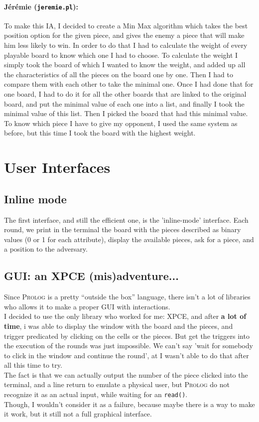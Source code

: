 \documentclass[a4paper,11pt]{article}
\newcommand{\tw}[1]{\texttt{#1}}
\begin{document}
		\paragraph{Jérémie (\tw{jeremie.pl}):} To make this IA, I decided to create a Min Max algorithm which takes the best position option for the given piece, and gives the enemy a piece that will make him less likely to win. In order to do that I had to calculate the weight of every playable board to know which one I had to choose. To calculate the weight I simply took the board of which I wanted to know the weight, and added up all the characteristics of all the pieces on the board one by one. Then I had to compare them with each other to take the minimal one. Once I had done that for one board, I had to do it for all the other boards that are linked to the original board, and put the minimal value of each one into a list, and finally I took the minimal value of this list. Then I picked the board that had this minimal value. \\
		To know which piece I have to give my opponent, I used the same system as before, but this time I took the board with the highest weight.

	
	\section{User Interfaces}
		\subsection{Inline mode}
			The first interface, and still the efficient one, is the 'inline-mode' interface. Each round, we print in the terminal the board with the pieces described as binary values (0 or 1 for each attribute), display the available pieces, ask for a piece, and a position to the adversary. 

		\subsection{GUI: an XPCE (mis)adventure...}
			Since \textsc{Prolog} is a pretty ``outside the box'' language, there isn't a lot of libraries who allows it to make a proper GUI with interactions. \\
			I decided to use the only library who worked for me: \textsc{XPCE}, and after \textbf{a lot of time}, i was able to display the window with the board and the pieces, and trigger predicated by clicking on the cells or the pieces. But get the triggers into the execution of the rounds was just impossible. We can't say 'wait for somebody to click in the window and continue the round', at I wasn't able to do that after all this time to try. \\
			The fact is that we can actually output the number of the piece clicked into the terminal, and a line return to emulate a physical user, but \textsc{Prolog} do not recognize it as an actual input, while waiting for an \tw{read()}. \\
			Though, I wouldn't consider it as a failure, because maybe there is a way to make it work, but it still not a full graphical interface.
	
\end{document}
